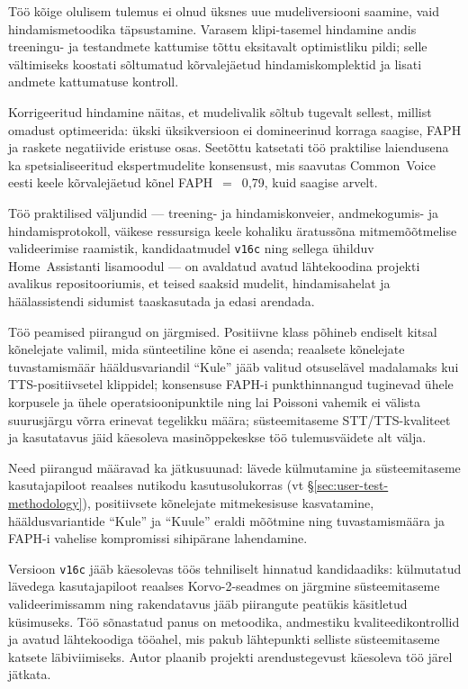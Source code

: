 Töö kõige olulisem tulemus ei olnud üksnes uue mudeliversiooni saamine, vaid hindamismetoodika täpsustamine. Varasem klipi-tasemel hindamine andis treeningu- ja testandmete kattumise tõttu eksitavalt optimistliku pildi; selle vältimiseks koostati sõltumatud kõrvalejäetud hindamiskomplektid ja lisati andmete kattumatuse kontroll.

Korrigeeritud hindamine näitas, et mudelivalik sõltub tugevalt sellest, millist omadust optimeerida: ükski üksikversioon ei domineerinud korraga saagise, FAPH ja raskete negatiivide eristuse osas. Seetõttu katsetati töö praktilise laiendusena ka spetsialiseeritud ekspertmudelite konsensust, mis saavutas Common~Voice eesti keele kõrvalejäetud kõnel FAPH~$=$~0{,}79, kuid saagise arvelt.

Töö praktilised väljundid --- treening- ja hindamiskonveier, andmekogumis- ja hindamisprotokoll, väikese ressursiga keele kohaliku äratussõna mitmemõõtmelise valideerimise raamistik, kandidaatmudel \texttt{v16c} ning sellega ühilduv Home~Assistanti lisamoodul --- on avaldatud avatud lähtekoodina projekti avalikus repositooriumis, et teised saaksid mudelit, hindamisahelat ja häälassistendi sidumist taaskasutada ja edasi arendada.

Töö peamised piirangud on järgmised. Positiivne klass põhineb endiselt kitsal kõnelejate valimil, mida sünteetiline kõne ei asenda; reaalsete kõnelejate tuvastamismäär hääldusvariandil \enquote{Kule} jääb valitud otsuselävel madalamaks kui TTS-positiivsetel klippidel; konsensuse FAPH-i punkthinnangud tuginevad ühele korpusele ja ühele operatsioonipunktile ning lai Poissoni vahemik ei välista suurusjärgu võrra erinevat tegelikku määra; süsteemitaseme STT/TTS-kvaliteet ja kasutatavus jäid käesoleva masinõppekeskse töö tulemusväidete alt välja.

Need piirangud määravad ka jätkusuunad: lävede külmutamine ja süsteemitaseme kasutajapiloot reaalses nutikodu kasutusolukorras (vt §\ref{sec:user-test-methodology}), positiivsete kõnelejate mitmekesisuse kasvatamine, hääldusvariantide \enquote{Kule} ja \enquote{Kuule} eraldi mõõtmine ning tuvastamismäära ja FAPH-i vahelise kompromissi sihipärane lahendamine.

Versioon \texttt{v16c} jääb käesolevas töös tehniliselt hinnatud kandidaadiks: külmutatud lävedega kasutajapiloot reaalses Korvo-2-seadmes on järgmine süsteemitaseme valideerimissamm ning rakendatavus jääb piirangute peatükis käsitletud küsimuseks. Töö sõnastatud panus on metoodika, andmestiku kvaliteedikontrollid ja avatud lähtekoodiga tööahel, mis pakub lähtepunkti selliste süsteemitaseme katsete läbiviimiseks. Autor plaanib projekti arendustegevust käesoleva töö järel jätkata.
